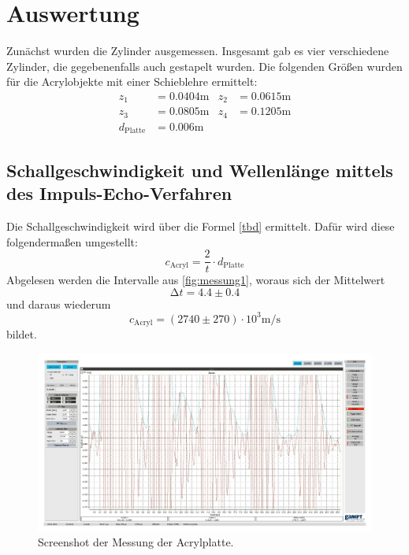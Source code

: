 \section{Auswertung}
\label{sec:Auswertung}

Zunächst wurden die Zylinder ausgemessen. Insgesamt gab es vier verschiedene Zylinder, die gegebenenfalls auch gestapelt wurden.
Die folgenden Größen wurden für die Acrylobjekte mit einer Schieblehre ermittelt:
\begin{align*}
  z_1 &= 0.0404 \unit\meter & z_2 &= 0.0615 \unit\meter \\
  z_3 &= 0.0805 \unit\meter & z_4 &= 0.1205 \unit\meter \\
  d_\text{Platte} &= 0.006 \unit\meter
\end{align*}

\subsection{Schallgeschwindigkeit und Wellenlänge mittels des Impuls-Echo-Verfahren}

Die Schallgeschwindigkeit wird über die Formel \autoref{tbd} ermittelt.
Dafür wird diese folgendermaßen umgestellt:
\begin{equation}\label{eq:c_schall}
  c_\text{Acryl} = \frac{2}{t} \cdot d_\text{Platte}
\end{equation}
Abgelesen werden die Intervalle aus \autoref{fig:messung1}, woraus sich der Mittelwert
\begin{equation}
  \increment t = 4.4 \pm 0.4
\end{equation}
und daraus wiederum
\begin{equation}
  c_\text{Acryl} = (2740 \pm 270) \cdot 10^3 \unit{\meter / \second}
\end{equation}
bildet. 

\begin{figure} [H]
  \centering
  \includegraphics[width =\linewidth]{pictures/Schallgeschwindigkeit/Messung1.pdf}
  \caption{Screenshot der Messung der Acrylplatte.}
  \label{fig:messung1}
\end{figure}

